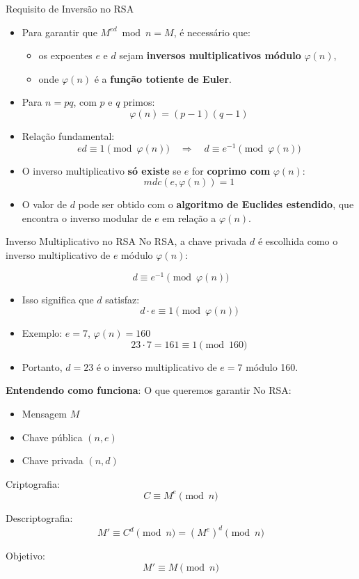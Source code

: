 \begin{frame}{Requisito de Inversão no RSA}
  \begin{itemize}
    \item Para garantir que $M^{ed} \bmod n = M$, é necessário que:
          \begin{itemize}
            \item os expoentes $e$ e $d$ sejam \textbf{inversos multiplicativos módulo} $\varphi(n)$,
            \item onde $\varphi(n)$ é a \textbf{função totiente de Euler}.
          \end{itemize}
    \item Para $n = pq$, com $p$ e $q$ primos:
          \[
            \varphi(n) = (p-1)(q-1)
          \]
    \item Relação fundamental:
          \[
            ed \equiv 1 \pmod{\varphi(n)} \quad \Rightarrow \quad d \equiv e^{-1} \pmod{\varphi(n)}
          \]
    \item O inverso multiplicativo \textbf{só existe} se $e$ for \textbf{coprimo com} $\varphi(n)$:
          \[
            mdc(e, \varphi(n)) = 1
          \]
    \item O valor de $d$ pode ser obtido com o \textbf{algoritmo de Euclides estendido},
          que encontra o inverso modular de $e$ em relação a $\varphi(n)$.
  \end{itemize}
\end{frame}

\begin{frame}{Inverso Multiplicativo no RSA}
  No RSA, a chave privada $d$ é escolhida como o inverso multiplicativo de $e$ módulo $\varphi(n)$:

  \[
    d \equiv e^{-1} \pmod{\varphi(n)}
  \]

  \begin{itemize}
    \item Isso significa que $d$ satisfaz:
          \[
            d \cdot e \equiv 1 \pmod{\varphi(n)}
          \]
    \item Exemplo: $e = 7$, $\varphi(n) = 160$
          \[
            23 \cdot 7 = 161 \equiv 1 \pmod{160}
          \]
    \item Portanto, $d = 23$ é o inverso multiplicativo de $e = 7$ módulo 160.

  \end{itemize}
\end{frame}

\begin{frame}{\textbf{Entendendo como funciona}: O que queremos garantir}
  No RSA:
  \begin{itemize}
    \item Mensagem \(M\)
    \item Chave pública \((n, e)\)
    \item Chave privada \((n, d)\)
  \end{itemize}

  Criptografia:
  \[
    C \equiv M^e \pmod{n}
  \]

  Descriptografia:
  \[
    M' \equiv C^d \pmod{n} = (M^e)^d \pmod{n}
  \]

  Objetivo:
  \[
    M' \equiv M \pmod{n}
  \]
\end{frame}

